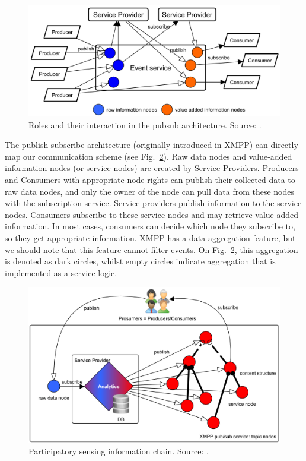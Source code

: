 \documentclass[b5paper,12pt]{report}
\theoremstyle{definition}
\begin{document}
\begin{figure}[ht!]
\centerline{
\includegraphics[width=12.6cm]{img/framework_roles.png}}
\caption{Roles and their interaction in the pubsub architecture. Source: \cite{szabo2013framework}.}
\label{framework_roles}
\end{figure}

The publish-subscribe architecture (originally introduced in XMPP) can directly map our communication scheme (see Fig.~\ref{framework_scheme}). Raw data nodes and value-added information nodes (or service nodes) are created by Service Providers. Producers and Consumers with appropriate node rights can publish their collected data to raw data nodes, and only the owner of the node can pull data from these nodes with the subscription service. Service providers publish information to the service nodes. Consumers subscribe to these service nodes and may retrieve value added information. In most cases, consumers can decide which node they subscribe to, so they get appropriate information. XMPP has a data aggregation feature, but we should note that this feature cannot filter events. On Fig.~\ref{framework_scheme}, this aggregation is denoted as dark circles, whilst empty circles indicate aggregation that is implemented as a service logic.

\begin{figure}[ht!]
\centerline{
\includegraphics[width=12.6cm]{img/framework_scheme.png}}
\caption{Participatory sensing information chain. Source: \cite{szabo2013framework}.}
\label{framework_scheme}
\end{figure}
\end{document}

